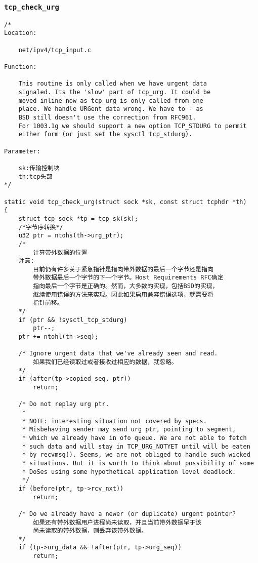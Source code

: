 		\subsubsection{\texttt{tcp_check_urg}}
			\label{TCPUrgent:tcp_check_urg}

\begin{verbatim}
/*
Location:

	net/ipv4/tcp_input.c

Function:

	This routine is only called when we have urgent data
	signaled. Its the 'slow' part of tcp_urg. It could be
	moved inline now as tcp_urg is only called from one
	place. We handle URGent data wrong. We have to - as
	BSD still doesn't use the correction from RFC961.
	For 1003.1g we should support a new option TCP_STDURG to permit
	either form (or just set the sysctl tcp_stdurg).

Parameter:

	sk:传输控制块
	th:tcp头部
*/

static void tcp_check_urg(struct sock *sk, const struct tcphdr *th)
{
	struct tcp_sock *tp = tcp_sk(sk);
	/*字节序转换*/
	u32 ptr = ntohs(th->urg_ptr);
	/*
		计算带外数据的位置
	注意:
		目前仍有许多关于紧急指针是指向带外数据的最后一个字节还是指向
		带外数据最后一个字节的下一个字节。Host Requirements RFC确定
		指向最后一个字节是正确的。然而，大多数的实现，包括BSD的实现，
		继续使用错误的方法来实现。因此如果启用兼容错误选项，就需要将
		指针前移。
	*/
	if (ptr && !sysctl_tcp_stdurg)
		ptr--;
	ptr += ntohl(th->seq);

	/* Ignore urgent data that we've already seen and read. 
		如果我们已经读取过或者接收过相应的数据，就忽略。
	*/
	if (after(tp->copied_seq, ptr))
		return;

	/* Do not replay urg ptr.
	 *
	 * NOTE: interesting situation not covered by specs.
	 * Misbehaving sender may send urg ptr, pointing to segment,
	 * which we already have in ofo queue. We are not able to fetch
	 * such data and will stay in TCP_URG_NOTYET until will be eaten
	 * by recvmsg(). Seems, we are not obliged to handle such wicked
	 * situations. But it is worth to think about possibility of some
	 * DoSes using some hypothetical application level deadlock.
	 */
	if (before(ptr, tp->rcv_nxt))
		return;

	/* Do we already have a newer (or duplicate) urgent pointer? 
		如果还有带外数据用户进程尚未读取，并且当前带外数据早于该
		尚未读取的带外数据，则丢弃该带外数据。
	*/
	if (tp->urg_data && !after(ptr, tp->urg_seq))
		return;


\end{verbatim}
